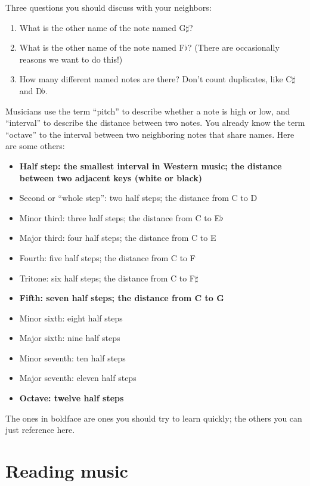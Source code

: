 \documentclass[10pt]{article}
\begin{document}
Three questions you should discuss with your neighbors:

\begin{enumerate}
\item What is the other name of the note named G$\sharp$?
\item What is the other name of the note named F$\flat$? (There are occasionally reasons we want to do this!)
\item How many different named notes are there? Don't count duplicates, like C$\sharp$ and D$\flat$.
\end{enumerate}


Musicians use the term ``pitch'' to describe whether a note is high or low, and ``interval'' to 
describe the distance between two notes. You already know the term ``octave''
to the interval between two neighboring notes that share names. Here are some others:

\begin{itemize}
\item {\bf Half step: the smallest interval in Western music; the distance between two adjacent keys (white or black)}
\item Second or ``whole step'': two half steps; the distance from C to D
\item Minor third: three half steps; the distance from C to E$\flat$
\item Major third: four half steps; the distance from C to E
\item Fourth: five half steps; the distance from C to F
\item Tritone: six half steps; the distance from C to F$\sharp$
\item {\bf Fifth: seven half steps; the distance from C to G}
\item Minor sixth: eight half steps
\item Major sixth: nine half steps
\item Minor seventh: ten half steps
\item Major seventh: eleven half steps
\item {\bf Octave: twelve half steps}
\end{itemize}

The ones in boldface are ones you should try to learn quickly; the others you can just reference here.

\section {Reading music}
\end{document}
